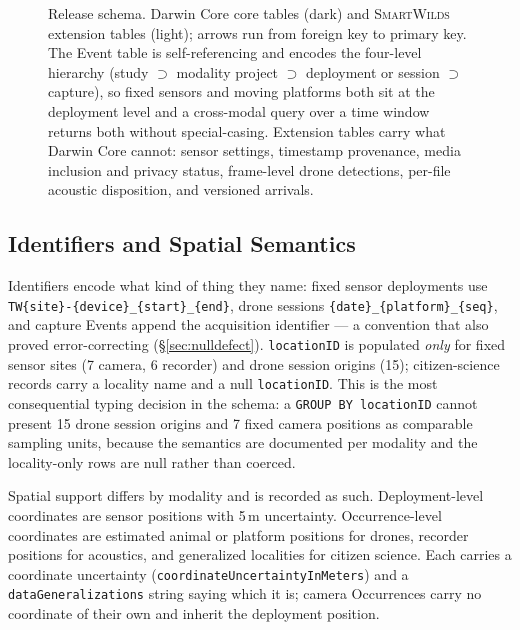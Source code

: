 \documentclass[sigconf]{acmart}
\newcommand{\smartwilds}{\textsc{SmartWilds}\xspace}
\begin{document}
\begin{figure}[t]
    \centering
    \resizebox{\linewidth}{!}{}
    \caption{Release schema. Darwin Core core tables (dark) and
    \smartwilds extension tables (light); arrows run from foreign key to
    primary key. The Event table is self-referencing and encodes the
    four-level hierarchy (study $\supset$ modality project $\supset$
    deployment or session $\supset$ capture), so fixed sensors and moving
    platforms both sit at the deployment level and a cross-modal query
    over a time window returns both without special-casing. Extension
    tables carry what Darwin Core cannot: sensor settings, timestamp
    provenance, media inclusion and privacy status, frame-level drone
    detections, per-file acoustic disposition, and versioned arrivals.}
    \label{fig:hierarchy}
\end{figure}

\subsection{Identifiers and Spatial Semantics}
\label{sec:identifiers}

Identifiers encode what kind of thing they name: fixed sensor
deployments use \texttt{TW\{site\}-\{device\}\_\{start\}\_\{end\}},
drone sessions \texttt{\{date\}\_\{platform\}\_\{seq\}}, and capture
Events append the acquisition identifier --- a convention that also
proved error-correcting (\S\ref{sec:nulldefect}).
\texttt{locationID} is populated \emph{only} for fixed sensor sites
(7 camera, 6 recorder) and drone session origins (15); citizen-science
records carry a locality name and a null \texttt{locationID}. This is the most consequential typing decision in
the schema: a \texttt{GROUP BY locationID} cannot present 15 drone
session origins and 7 fixed camera positions as comparable sampling
units, because the semantics are documented per modality and the
locality-only rows are null rather than coerced.

Spatial support differs by modality and is recorded as such.
Deployment-level coordinates are sensor positions with 5\,m uncertainty.
Occurrence-level coordinates are estimated animal or platform
positions for drones, recorder positions for acoustics, and generalized
localities for citizen science. Each carries a coordinate
uncertainty (\texttt{coordinate\allowbreak Uncertainty\allowbreak InMeters})
and a \texttt{data\allowbreak Generalizations} string saying which it is; camera
Occurrences carry no coordinate of their own and inherit the deployment
position.
\end{document}
